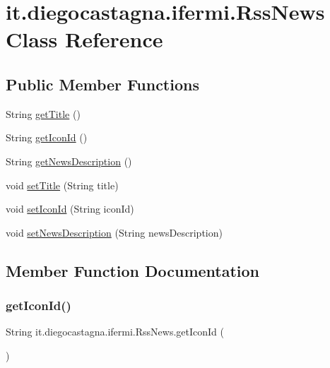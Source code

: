 \hypertarget{classit_1_1diegocastagna_1_1ifermi_1_1_rss_news}{}\section{it.\+diegocastagna.\+ifermi.\+Rss\+News Class Reference}
\label{classit_1_1diegocastagna_1_1ifermi_1_1_rss_news}
\subsection*{Public Member Functions}
\begin{DoxyCompactItemize}
\item 
String \mbox{\hyperlink{classit_1_1diegocastagna_1_1ifermi_1_1_rss_news_a122ce81c8e652e482f51a52c3f13a3eb}{get\+Title}} ()
\item 
String \mbox{\hyperlink{classit_1_1diegocastagna_1_1ifermi_1_1_rss_news_ad4c3e971c7a15d6e249793ced6510b51}{get\+Icon\+Id}} ()
\item 
String \mbox{\hyperlink{classit_1_1diegocastagna_1_1ifermi_1_1_rss_news_a3c1458f9773afa3839e63b7a3f8f21c5}{get\+News\+Description}} ()
\item 
void \mbox{\hyperlink{classit_1_1diegocastagna_1_1ifermi_1_1_rss_news_ad323fc7a490f74343ce2cae7aaeebb35}{set\+Title}} (String title)
\item 
void \mbox{\hyperlink{classit_1_1diegocastagna_1_1ifermi_1_1_rss_news_a5cc7736a0b4b038cc81394c044f25dad}{set\+Icon\+Id}} (String icon\+Id)
\item 
void \mbox{\hyperlink{classit_1_1diegocastagna_1_1ifermi_1_1_rss_news_addac79da6e66eb2aeffaa43d7b16b088}{set\+News\+Description}} (String news\+Description)
\end{DoxyCompactItemize}


\subsection{Member Function Documentation}
\mbox{\label{classit_1_1diegocastagna_1_1ifermi_1_1_rss_news_ad4c3e971c7a15d6e249793ced6510b51}} 
\subsubsection{\texorpdfstring{getIconId()}{getIconId()}}
{\footnotesize\ttfamily String it.\+diegocastagna.\+ifermi.\+Rss\+News.\+get\+Icon\+Id (\begin{DoxyParamCaption}{ }\end{DoxyParamCaption})\hspace{0.3cm}{\ttfamily [inline]}}

